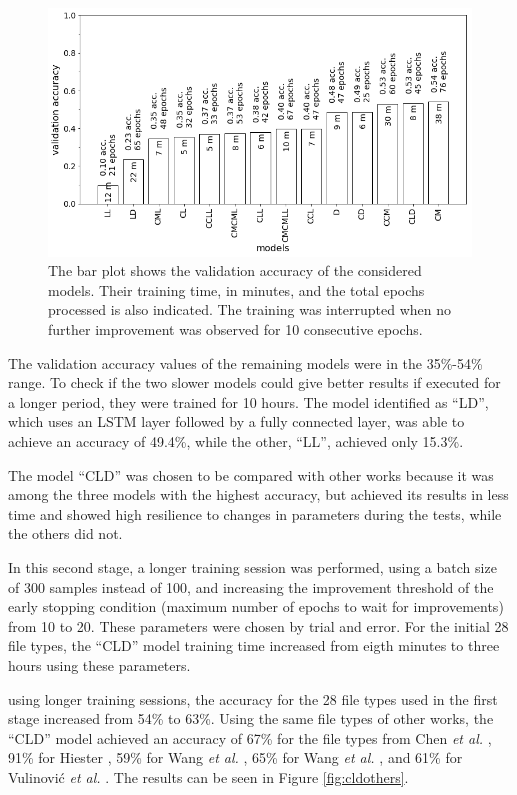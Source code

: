 \noindent
\begin{figure}[htb!]
\centering\includegraphics[width=1.0\textwidth]{content/models.png}
\caption[Validation accuracy of models]{\label{fig:models}The bar plot shows the validation accuracy of the considered models. Their training time, in minutes, and the total epochs processed is also indicated. The training was interrupted when no further improvement was observed for 10 consecutive epochs.}%
\end{figure}

The validation accuracy values of the remaining models were in the 35\%-54\% range.
To check if the two slower models could give better results if executed for a longer period, they were trained for 10 hours. The model identified as ``LD'', which uses an LSTM layer followed by a fully connected layer, was able to achieve an accuracy of 49.4\%, while the other, ``LL'', achieved only 15.3\%.

The model ``CLD'' was chosen to be compared with other works because it was among the three models with the highest accuracy, but achieved its results in less time and showed high resilience to changes in parameters during the tests, while the others did not.

In this second stage, a longer training session was performed, using a batch size of 300 samples instead of 100, and increasing the improvement threshold of the early stopping condition (maximum number of epochs to wait for improvements) from 10 to 20. These parameters were chosen by trial and error. For the initial 28 file types, the ``CLD'' model training time increased from eigth minutes to three hours using these parameters.
 
using longer training sessions, the accuracy for the 28 file types used in the first stage increased from 54\% to 63\%. Using the same file types of other works, the ``CLD'' model achieved an accuracy of 
67\% for the file types from Chen \textit{et al.} \cite{chen_file_2018},
91\% for Hiester \cite{hiester_file_2018}, 
59\% for Wang \textit{et al.} \cite{wang_sparse_2018},
65\% for Wang \textit{et al.} \cite{wang_file_2018},
and
61\% for Vulinović \textit{et al.} \cite{vulinovic_neural_2019}.
The results can be seen in Figure \ref{fig:cldothers}.

